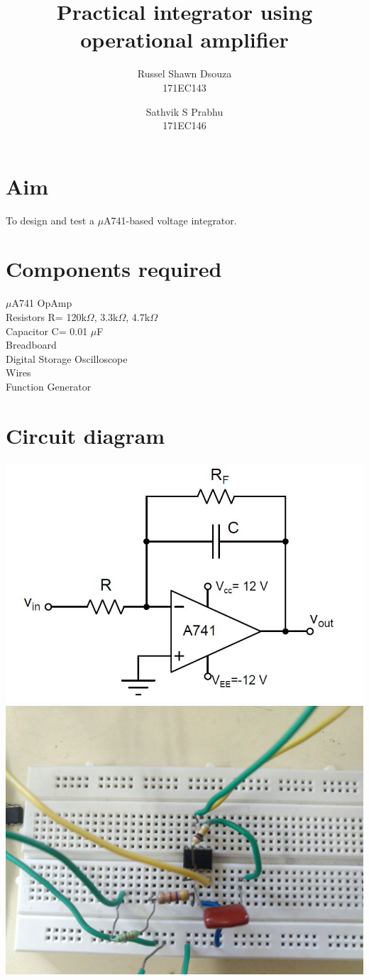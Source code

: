 \documentclass[12pt, titlepage]{article}
\title{\textbf{Practical integrator using operational amplifier}}
\author{
  Russel Shawn Dsouza\\
  171EC143
  \and
  Sathvik S Prabhu\\
  171EC146
}
\date{}
\theoremstyle{definition}
\begin{document}
  \maketitle

  \tableofcontents

  \newpage
  \section{Aim}
  To design and test a $\mu$A741-based voltage integrator.

  \section*{Components required}
  $\mu$A741 OpAmp\\
  Resistors R= 120k$\Omega$, 3.3k$\Omega$, 4.7k$\Omega$\\
  Capacitor C= 0.01 $\mu$F\\
  Breadboard\\
  Digital Storage Oscilloscope\\
  Wires\\
  Function Generator\\
  \section*{Circuit diagram}
  \includegraphics[scale=0.5]{circuit}
  \includegraphics[scale=0.25]{practical_circuit}
	
\end{document}
